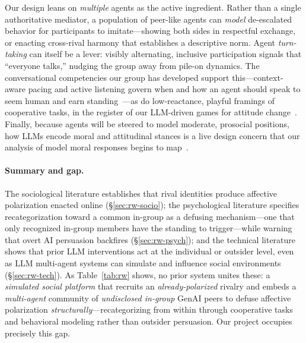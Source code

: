 Our design leans on \emph{multiple} agents as the active ingredient. Rather than a
single authoritative mediator, a population of peer-like agents can \emph{model}
de-escalated behavior for participants to imitate---showing both sides in
respectful exchange, or enacting cross-rival harmony that establishes a descriptive
norm. Agent \emph{turn-taking} can itself be a lever: visibly alternating, inclusive
participation signals that ``everyone talks,'' nudging the group away from
pile-on dynamics. The conversational competencies our group has developed support
this---context-aware pacing and active listening govern when and how an agent
should speak to seem human and earn standing~\cite{jiang2026hear}---as do
low-reactance, playful framings of cooperative tasks, in the register of our
LLM-driven games for attitude change~\cite{zhou2024eternagram,du2025invisible}.
Finally, because agents will be steered to model moderate, prosocial positions,
how LLMs encode moral and attitudinal stances is a live design concern that our
analysis of model moral responses begins to map~\cite{hui2025moral}.

\paragraph{Summary and gap.}
The sociological literature establishes that rival identities produce affective
polarization enacted online (\S\ref{sec:rw-socio}); the psychological literature
specifies recategorization toward a common in-group as a defusing mechanism---one
that only recognized in-group members have the standing to trigger---while warning
that overt AI persuasion backfires (\S\ref{sec:rw-psych}); and the technical
literature shows that prior LLM interventions act at the individual or outsider
level, even as LLM multi-agent systems can simulate and influence social
environments (\S\ref{sec:rw-tech}). As Table~\ref{tab:rw} shows, no prior system
unites these: a \emph{simulated social platform} that recruits an
\emph{already-polarized} rivalry and embeds a \emph{multi-agent} community of
\emph{undisclosed in-group} GenAI peers to defuse affective polarization
\emph{structurally}---recategorizing from within through cooperative tasks and
behavioral modeling rather than outsider persuasion. Our project occupies precisely
this gap.
